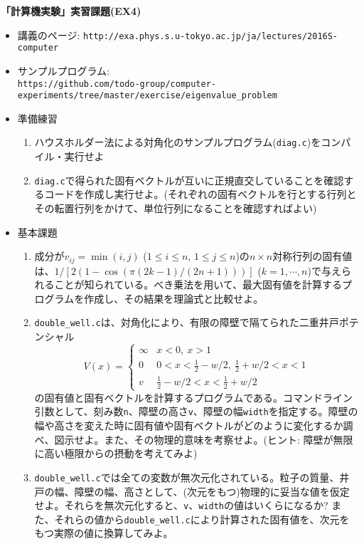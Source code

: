 \documentclass[11pt]{jarticle}
\begin{document}
\noindent
{\bf\large 「計算機実験」実習課題(EX4)}
\\[-0.5em]

\noindent
\begin{itemize}
\item 講義のページ: \verb+http://exa.phys.s.u-tokyo.ac.jp/ja/lectures/2016S-computer+

\item サンプルプログラム: \\ {\small \verb+https://github.com/todo-group/computer-experiments/tree/master/exercise/eigenvalue_problem+}
  
\item 準備練習
  \begin{enumerate}
  \item ハウスホルダー法による対角化のサンプルプログラム({\tt diag.c})をコンパイル・実行せよ
  \item {\tt diag.c}で得られた固有ベクトルが互いに正規直交していることを確認するコードを作成し実行せよ。(それぞれの固有ベクトルを行とする行列とその転置行列をかけて、単位行列になることを確認すればよい)
  \end{enumerate}

\item 基本課題
  \begin{enumerate}
  \item 成分が$v_{ij}=\min(i,j)$ ($1 \le i \le n$, $1 \le j \le n$)の$n \times n$対称行列の固有値は、$1/[2 (1 - \cos (\pi (2 k - 1) / (2 n + 1)))]$ ($k=1,\cdots,n$)で与えられることが知られている。べき乗法を用いて、最大固有値を計算するプログラムを作成し、その結果を理論式と比較せよ。
  \item {\tt double\_well.c}は、対角化により、有限の障壁で隔てられた二重井戸ポテンシャル
    \begin{equation*}
      V(x) = \begin{cases}
        \infty & x < 0, \ x > 1 \\
        0 & 0 < x < \frac{1}{2} - w/2, \ \frac{1}{2} + w/2 < x < 1 \\
        v & \frac{1}{2} - w/2 < x < \frac{1}{2} + w/2
      \end{cases}
    \end{equation*}
    の固有値と固有ベクトルを計算するプログラムである。コマンドライン引数として、刻み数{\tt n}、障壁の高さ{\tt v}、障壁の幅{\tt width}を指定する。障壁の幅や高さを変えた時に固有値や固有ベクトルがどのように変化するか調べ、図示せよ。また、その物理的意味を考察せよ。(ヒント: 障壁が無限に高い極限からの摂動を考えてみよ)
  \item {\tt double\_well.c}では全ての変数が無次元化されている。粒子の質量、井戸の幅、障壁の幅、高さとして、(次元をもつ)物理的に妥当な値を仮定せよ。それらを無次元化すると、{\tt v}、{\tt width}の値はいくらになるか? また、それらの値から{\tt double\_well.c}により計算された固有値を、次元をもつ実際の値に換算してみよ。
  \end{enumerate}
  

\end{itemize}
\end{document}
